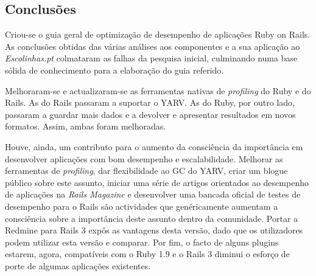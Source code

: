 \documentclass[9pt,a4paper]{extarticle}
\begin{document}
\begin{multicols}{2}
\section{Conclusões}
Criou-se o guia geral de optimização de desempenho de aplicações Ruby on Rails. As conclusões obtidas das várias análises aos componentes e a sua aplicação ao \textit{Escolinhas.pt} colmataram as falhas da pesquisa inicial, culminando numa base sólida de conhecimento para a elaboração do guia referido.

Melhoraram-se e actualizaram-se as ferramentas nativas de \textit{profiling} do Ruby e do Rails. As do Rails passaram a suportar o YARV. As do Ruby, por outro lado, passaram a guardar mais dados e a devolver e apresentar resultados em novos formatos. Assim, ambas foram melhoradas.

Houve, ainda, um contributo para o aumento da consciência da importância em desenvolver aplicações com bom desempenho e escalabilidade. Melhorar as ferramentas de \textit{profiling}, dar flexibilidade ao GC do YARV, criar um blogue público sobre este assunto, iniciar uma série de artigos orientados ao desempenho de aplicações na \textit{Rails Magazine} e desenvolver uma bancada oficial de testes de desempenho para o Rails são actividades que genéricamente aumentam a consciência sobre a importância deste assunto dentro da comunidade. Portar a Redmine para Rails 3 expôs as vantagens desta versão, dado que os utilizadores podem utilizar esta versão e comparar. Por fim, o facto de alguns plugins estarem, agora, compatíveis com o Ruby 1.9 e o Rails 3 diminui o esforço de porte de algumas aplicações existentes.


%

\end{multicols}
\end{document}
